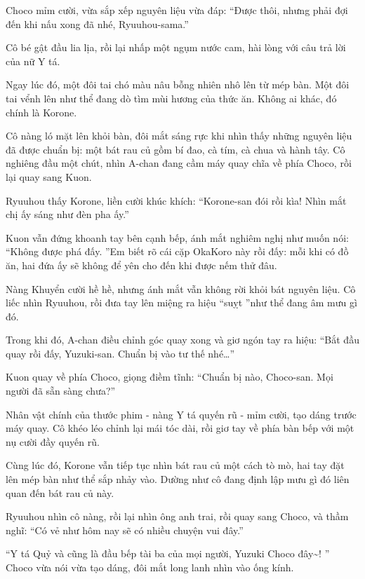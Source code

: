\documentclass[../main.tex]{subfiles}
\begin{document}
Choco mỉm cười, vừa sắp xếp nguyên liệu vừa đáp: ``Được thôi, nhưng phải đợi đến khi nấu xong đã nhé, Ryuuhou-sama.''

Cô bé gật đầu lia lịa, rồi lại nhấp một ngụm nước cam, hài lòng với câu trả lời của nữ Y tá.

Ngay lúc đó, một đôi tai chó màu nâu bỗng nhiên nhô lên từ mép bàn. Một đôi tai vểnh lên như thể đang dò tìm mùi hương của thức ăn. Không ai khác, đó chính là Korone.


Cô nàng ló mặt lên khỏi bàn, đôi mắt sáng rực khi nhìn thấy những nguyên liệu đã được chuẩn bị: một bát rau củ gồm bí đao, cà tím, cà chua và hành tây. Cô nghiêng đầu một chút, nhìn A-chan đang cầm máy quay chĩa về phía Choco, rồi lại quay sang Kuon.

Ryuuhou thấy Korone, liền cười khúc khích: ``Korone-san đói rồi kìa! Nhìn mắt chị ấy sáng như đèn pha ấy.''

Kuon vẫn đứng khoanh tay bên cạnh bếp, ánh mắt nghiêm nghị như muốn nói: ``Không được phá đấy. ''Em biết rõ cái cặp OkaKoro này rồi đấy: mỗi khi có đồ ăn, hai đứa ấy sẽ không để yên cho đến khi được nếm thử đâu.

Nàng Khuyển cười hề hề, nhưng ánh mắt vẫn không rời khỏi bát nguyên liệu. Cô liếc nhìn Ryuuhou, rồi đưa tay lên miệng ra hiệu ``suỵt ''như thể đang âm mưu gì đó.

Trong khi đó, A-chan điều chỉnh góc quay xong và giơ ngón tay ra hiệu: ``Bắt đầu quay rồi đấy, Yuzuki-san. Chuẩn bị vào tư thế nhé\dots''

Kuon quay về phía Choco, giọng điềm tĩnh: ``Chuẩn bị nào, Choco-san. Mọi người đã sẵn sàng chưa?''

Nhân vật chính của thước phim - nàng Y tá quyến rũ - mỉm cười, tạo dáng trước máy quay. Cô khéo léo chỉnh lại mái tóc dài, rồi giơ tay về phía bàn bếp với một nụ cười đầy quyến rũ.


Cùng lúc đó, Korone vẫn tiếp tục nhìn bát rau củ một cách tò mò, hai tay đặt lên mép bàn như thể sắp nhảy vào. Dường như cô đang định lập mưu gì đó liên quan đến bát rau củ này.

Ryuuhou nhìn cô nàng, rồi lại nhìn ông anh trai, rồi quay sang Choco, và thầm nghĩ: ``Có vẻ như hôm nay sẽ có nhiều chuyện vui đây.''

\il

``Y tá Quỷ và cũng là đầu bếp tài ba của mọi người, Yuzuki Choco đây\~{}! '' Choco vừa nói vừa tạo dáng, đôi mắt long lanh nhìn vào ống kính.
\end{document}

